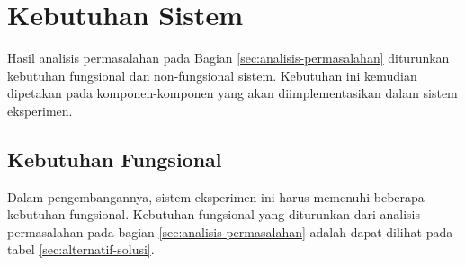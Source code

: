 \section{Kebutuhan Sistem}
\label{sec:system-requirements}

Hasil analisis permasalahan pada Bagian \ref{sec:analisis-permasalahan} diturunkan kebutuhan fungsional dan non-fungsional sistem. Kebutuhan ini kemudian dipetakan pada komponen-komponen yang akan diimplementasikan dalam sistem eksperimen.

\subsection{Kebutuhan Fungsional}
\label{subsection:functional-requirements}

Dalam pengembangannya, sistem eksperimen ini harus memenuhi beberapa kebutuhan fungsional. Kebutuhan fungsional yang diturunkan dari analisis permasalahan pada bagian \ref{sec:analisis-permasalahan} adalah dapat dilihat pada tabel \ref{sec:alternatif-solusi}.

